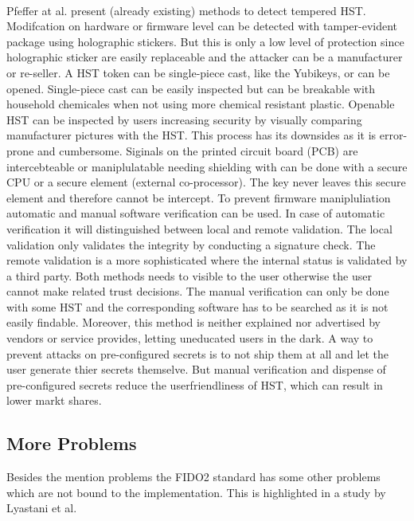 \documentclass[runningheads]{llncs}
\begin{document}
\paragraph{}
Pfeffer at al. present (already existing) methods to detect tempered HST.
Modifcation on hardware or firmware level can be detected with tamper-evident package using holographic stickers. But this is only a low level of protection since holographic sticker are easily replaceable and the attacker can be a manufacturer or re-seller. A HST token can be single-piece cast, like the Yubikeys, or can be opened. Single-piece cast can be easily inspected but can be breakable with household chemicales when not using more chemical resistant plastic. Openable HST can be inspected by users increasing security by visually comparing manufacturer pictures with the HST. This process has its downsides as it is error-prone and cumbersome. Siginals on the printed circuit board (PCB) are intercebteable or maniplulatable needing shielding with can be done with a secure CPU or a secure element (external co-processor). The key never leaves this secure element and therefore cannot be intercept. To prevent firmware manipluliation automatic and manual software verification can be used. In case of automatic verification it will distinguished between local and remote validation. The local validation only validates the integrity by conducting a signature check. The remote validation is a more sophisticated where the internal status is validated by a third party. Both methods needs to visible to the user otherwise the user cannot make related trust decisions.
The manual verification can only be done with some HST and the corresponding software has to be searched as it is not easily findable. Moreover, this method is neither explained nor advertised by vendors or service provides, letting uneducated users in the dark. A way to prevent attacks on pre-configured secrets is to not ship them at all and let the user generate thier secrets themselve. But manual verification and dispense of pre-configured secrets reduce the userfriendliness of HST, which can result in lower markt shares. \cite{272198}

\subsection{More Problems}
Besides the mention problems the FIDO2 standard has some other problems which are not bound to the implementation. This is highlighted in a study by Lyastani et al. \cite{9152694}
\end{document}
